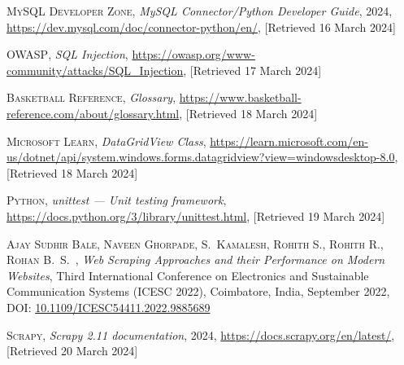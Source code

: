 \documentclass{thesis-ekf}
\theoremstyle{definition}
\theoremstyle{remark}
\begin{document}
\begin{thebibliography}{2}
\textsc{MySQL Developer Zone},
\emph{MySQL Connector/Python Developer Guide}, 2024,
\url{https://dev.mysql.com/doc/connector-python/en/}, [Retrieved 16 March 2024]

\textsc{OWASP},
\emph{SQL Injection},
\url{https://owasp.org/www-community/attacks/SQL_Injection}, [Retrieved 17 March 2024]

\textsc{Basketball Reference},
\emph{Glossary},
\url{https://www.basketball-reference.com/about/glossary.html}, [Retrieved 18 March 2024]

\textsc{Microsoft Learn},
\emph{DataGridView Class},
\url{https://learn.microsoft.com/en-us/dotnet/api/system.windows.forms.datagridview?view=windowsdesktop-8.0}, [Retrieved 18 March 2024]

\textsc{Python},
\emph{unittest — Unit testing framework},
\url{https://docs.python.org/3/library/unittest.html}, [Retrieved 19 March 2024]

\textsc{Ajay Sudhir Bale, Naveen Ghorpade, S.~Kamalesh, Rohith S., Rohith R., Rohan B.~S.~},
\emph{Web Scraping Approaches and their Performance on Modern Websites},
Third International Conference on Electronics and Sustainable Communication Systems (ICESC 2022),
Coimbatore, India, September 2022,
DOI: \href{https://doi.org/10.1109/ICESC54411.2022.9885689}{10.1109/ICESC54411.2022.9885689}

\textsc{Scrapy},
\emph{Scrapy 2.11 documentation}, 2024, 
\url{https://docs.scrapy.org/en/latest/}, [Retrieved 20 March 2024]

\end{thebibliography}




\end{document}
